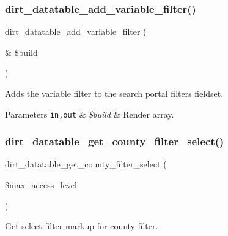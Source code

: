 \subsubsection{\texorpdfstring{dirt\+\_\+datatable\+\_\+add\+\_\+variable\+\_\+filter()}{dirt\_datatable\_add\_variable\_filter()}}
{\footnotesize\ttfamily dirt\+\_\+datatable\+\_\+add\+\_\+variable\+\_\+filter (\begin{DoxyParamCaption}\item[{\&}]{\$build }\end{DoxyParamCaption})}

Adds the variable filter to the search portal filters fieldset.


\begin{DoxyParams}[1]{Parameters}
\mbox{\tt in,out}  & {\em \$build} & Render array. \\
\hline
\end{DoxyParams}
\mbox{\label{dirt__datatable_8data__search__portal_8inc_acecff4c3a5e4c22b1becb98232f67d96}} 
\subsubsection{\texorpdfstring{dirt\+\_\+datatable\+\_\+get\+\_\+county\+\_\+filter\+\_\+select()}{dirt\_datatable\_get\_county\_filter\_select()}}
{\footnotesize\ttfamily dirt\+\_\+datatable\+\_\+get\+\_\+county\+\_\+filter\+\_\+select (\begin{DoxyParamCaption}\item[{}]{\$max\+\_\+access\+\_\+level }\end{DoxyParamCaption})}

Get select filter markup for county filter.


